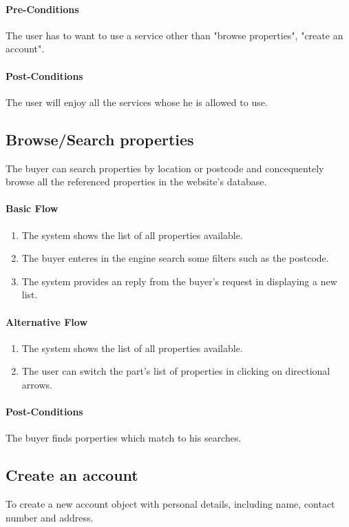 \documentclass[a4paper,12pt]{article}
\begin{document}
\paragraph{Pre-Conditions}
The user has to want to use a service other than "browse properties", "create an account".
\paragraph{Post-Conditions}
The user will enjoy all the services whose he is allowed to use.

\subsection{Browse/Search properties}
The buyer can search properties by location or postcode and concequentely browse all the referenced properties in the website's database.
\paragraph{Basic Flow}
\begin{enumerate}
\item The system shows the list of all properties available.
\item The buyer enteres in the engine search some filters such as the postcode.
\item The system provides an reply from the buyer's request in displaying a new list.
\end{enumerate}
\paragraph{Alternative Flow}
\begin{enumerate}
\item The system shows the list of all properties available.
\item The user can switch the part's list of properties in clicking on directional arrows.
\end{enumerate}
\paragraph{Post-Conditions}
The buyer finds porperties which match to his searches.

\subsection{Create an account}
To create a new account object with personal details, including name, contact number and address.
\end{document}
